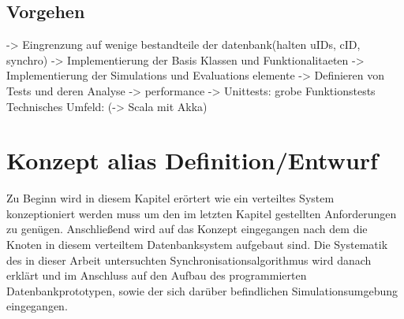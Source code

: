 \documentclass[a4paper,11pt,oneside,%
headsepline,												%
footsepline,												%
bibtotocnumbered									%
]{scrreprt}
\begin{document}
\section{Vorgehen}
-> Eingrenzung auf wenige bestandteile der datenbank(halten uIDs, cID, synchro)
-> Implementierung der Basis Klassen und Funktionalitaeten 
-> Implementierung der Simulations und Evaluations elemente
-> Definieren von Tests und deren Analyse
-> performance
-> Unittests: grobe Funktionstests 
Technisches Umfeld:
(-> Scala mit Akka)






\chapter{Konzept alias Definition/Entwurf}
Zu Beginn wird in diesem Kapitel erörtert wie ein verteiltes System konzeptioniert werden muss um den im letzten Kapitel gestellten Anforderungen zu genügen. Anschließend wird auf das Konzept eingegangen nach dem die Knoten in diesem verteiltem Datenbanksystem aufgebaut sind. Die Systematik des in dieser Arbeit untersuchten Synchronisationsalgorithmus wird danach erklärt und im Anschluss auf den Aufbau des programmierten Datenbankprototypen, sowie der sich darüber befindlichen Simulationsumgebung eingegangen.
\end{document}
